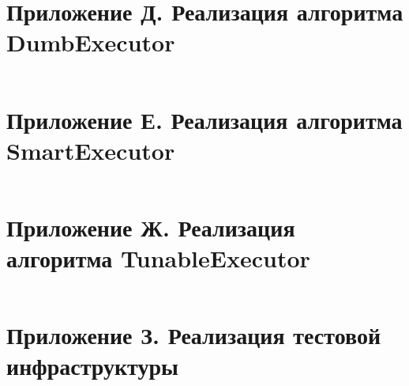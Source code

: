 \documentclass{matmex-diploma}
\begin{document}
\section*{Приложение Д. Реализация алгоритма DumbExecutor}
    \inputminted[breaklines=true]{java}{../sources/DumbExecutor.java}
\section*{Приложение Е. Реализация алгоритма SmartExecutor}
    \inputminted[breaklines=true]{java}{../sources/SmartExecutor.java}
\section*{Приложение Ж. Реализация алгоритма TunableExecutor}
    \inputminted[breaklines=true]{java}{../sources/TunableExecutor.java}
\section*{Приложение З. Реализация тестовой инфраструктуры}
    \inputminted[breaklines=true]{java}{../sources/TuningTest.java}
\end{document}
